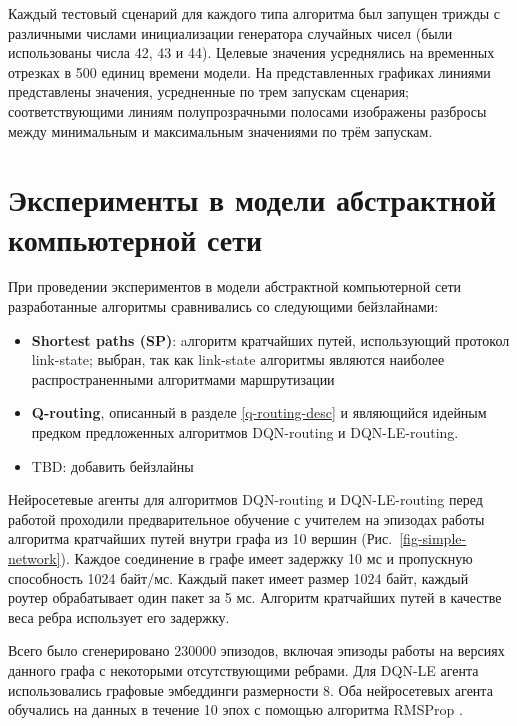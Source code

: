 \documentclass[specification,annotation,times]{itmo-student-thesis}
\theoremstyle{definition}
\begin{document}
Каждый тестовый сценарий для каждого типа алгоритма был запущен трижды с
различными числами инициализации генератора случайных чисел (были использованы
числа 42, 43 и 44). Целевые значения усреднялись на временных отрезках в 500
единиц времени модели. На представленных графиках линиями представлены значения,
усредненные по трем запускам сценария; соответствующими линиям полупрозрачными
полосами изображены разбросы между минимальным и максимальным значениями по трём
запускам.

\section{Эксперименты в модели абстрактной компьютерной сети}\label{experiments:network}

При проведении экспериментов в модели абстрактной компьютерной сети разработанные алгоритмы
сравнивались со следующими бейзлайнами:

\begin{itemize}
  \item \textbf{Shortest paths (SP)}: aлгоритм кратчайших путей, использующий
    протокол link-state; выбран, так как link-state алгоритмы являются наиболее
    распространенными алгоритмами маршрутизации
  \item \textbf{Q-routing}, описанный в разделе \ref{q-routing-desc} и
    являющийся идейным предком предложенных алгоритмов DQN-routing и DQN-LE-routing.
  \item TBD: добавить бейзлайны
\end{itemize}

Нейросетевые агенты для алгоритмов DQN-routing и DQN-LE-routing перед работой
проходили предварительное обучение с учителем на эпизодах работы алгоритма
кратчайших путей внутри графа из 10 вершин (Рис.~\ref{fig-simple-network}).
Каждое соединение в графе имеет задержку 10 мс и пропускную способность 1024 байт/мс.
Каждый пакет имеет размер 1024 байт, каждый роутер обрабатывает один пакет за 5
мс. Алгоритм кратчайших путей в качестве веса ребра использует его задержку.

Всего было сгенерировано 230000 эпизодов, включая эпизоды работы на версиях
данного графа с некоторыми отсутствующими ребрами. Для DQN-LE агента
использовались графовые эмбеддинги размерности 8. Оба нейросетевых агента
обучались на данных в течение 10 эпох с помощью алгоритма RMSProp \cite{tieleman2012lecture}.
\end{document}
